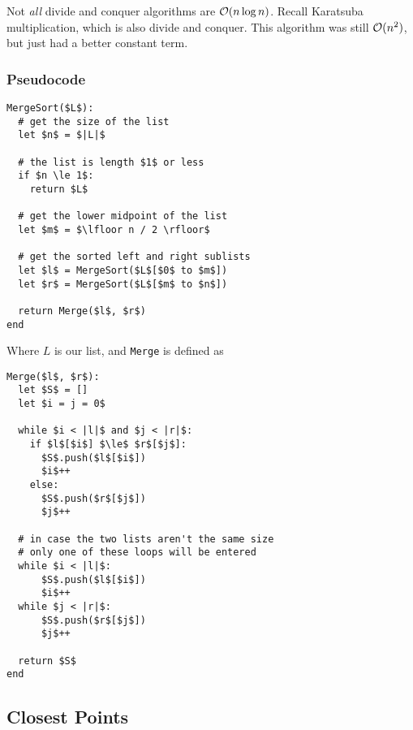 \documentclass[12pt]{article}
\begin{document}

  Not {\it all} divide and conquer algorithms are $\mathcal O(n \log n)$. Recall Karatsuba
  multiplication, which is also divide and conquer. This algorithm was still
  $\mathcal O(n^2)$, but just had a better constant term.

  \subsubsection{Pseudocode}

  \begin{lstlisting}
MergeSort($L$):
  # get the size of the list
  let $n$ = $|L|$

  # the list is length $1$ or less
  if $n \le 1$:
    return $L$

  # get the lower midpoint of the list
  let $m$ = $\lfloor n / 2 \rfloor$

  # get the sorted left and right sublists
  let $l$ = MergeSort($L$[$0$ to $m$])
  let $r$ = MergeSort($L$[$m$ to $n$])

  return Merge($l$, $r$)
end
  \end{lstlisting}

  Where $L$ is our list, and \texttt{Merge} is defined as

  \begin{lstlisting}
Merge($l$, $r$):
  let $S$ = []
  let $i = j = 0$

  while $i < |l|$ and $j < |r|$:
    if $l$[$i$] $\le$ $r$[$j$]:
      $S$.push($l$[$i$])
      $i$++
    else:
      $S$.push($r$[$j$])
      $j$++

  # in case the two lists aren't the same size
  # only one of these loops will be entered
  while $i < |l|$:
      $S$.push($l$[$i$])
      $i$++
  while $j < |r|$:
      $S$.push($r$[$j$])
      $j$++

  return $S$
end
  \end{lstlisting}

  \subsection{Closest Points}
\end{document}
